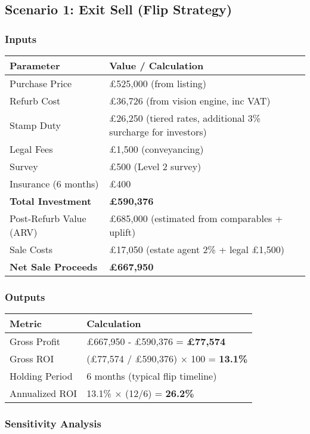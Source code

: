 \documentclass[11pt,a4paper]{article}
\begin{document}
\subsection{Scenario 1: Exit Sell (Flip Strategy)}

\subsubsection{Inputs}

\begin{longtable}{@{}p{5cm}p{9cm}@{}}
\toprule
\textbf{Parameter} & \textbf{Value / Calculation} \\
\midrule
Purchase Price & £525,000 (from listing) \\
Refurb Cost & £36,726 (from vision engine, inc VAT) \\
Stamp Duty & £26,250 (tiered rates, additional 3\% surcharge for investors) \\
Legal Fees & £1,500 (conveyancing) \\
Survey & £500 (Level 2 survey) \\
Insurance (6 months) & £400 \\
\textbf{Total Investment} & \textbf{£590,376} \\
\addlinespace
Post-Refurb Value (ARV) & £685,000 (estimated from comparables + uplift) \\
Sale Costs & £17,050 (estate agent 2\% + legal £1,500) \\
\textbf{Net Sale Proceeds} & \textbf{£667,950} \\
\bottomrule
\end{longtable}

\subsubsection{Outputs}

\begin{longtable}{@{}p{5cm}p{9cm}@{}}
\toprule
\textbf{Metric} & \textbf{Calculation} \\
\midrule
Gross Profit & £667,950 - £590,376 = \textbf{£77,574} \\
Gross ROI & (£77,574 / £590,376) × 100 = \textbf{13.1\%} \\
Holding Period & 6 months (typical flip timeline) \\
Annualized ROI & 13.1\% × (12/6) = \textbf{26.2\%} \\
\bottomrule
\end{longtable}

\subsubsection{Sensitivity Analysis}
\end{document}
